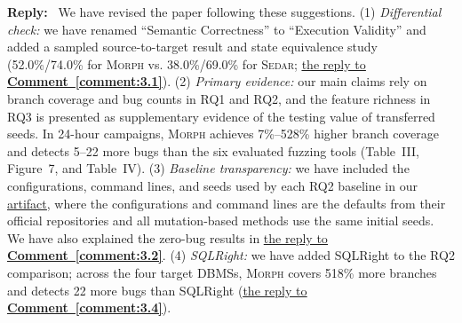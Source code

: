 \documentclass[12pt,letterpaper]{article}
\let\oldhref\href
\renewcommand{\href}[2]{\oldhref{#1}{\uline{#2}}}
\newcommand{\morph}{\textsc{Morph}}
\newcommand{\sedar}{\textsc{Sedar}}
\newcommand{\tool}{\morph}
\newcommand{\commentref}[1]{\hyperref[comment:#1]{\uline{the reply to \textbf{Comment~\ref*{comment:#1}}}}}
\newcommand{\reply}{\par\nobreak\noindent\textbf{Reply:}\ }
\begin{document}
\reply
We have revised the paper following these suggestions. (1) \textit{Differential check:} we have renamed ``Semantic Correctness'' to ``Execution Validity'' and added a sampled source-to-target result and state equivalence study (52.0\%/74.0\% for \tool{} vs. 38.0\%/69.0\% for \sedar{}; \commentref{3.1}). (2) \textit{Primary evidence:} our main claims rely on branch coverage and bug counts in RQ1 and RQ2, and the feature richness in RQ3 is presented as supplementary evidence of the testing value of transferred seeds. In 24-hour campaigns, \tool{} achieves 7\%--528\% higher branch coverage and detects 5--22 more bugs than the six evaluated fuzzing tools (Table~III, Figure~7, and Table~IV). (3) \textit{Baseline transparency:} we have included the configurations, command lines, and seeds used by each RQ2 baseline in our \href{https://anonymous.4open.science/r/MorphArtifact-8E44/}{artifact}, where the configurations and command lines are the defaults from their official repositories and all mutation-based methods use the same initial seeds. We have also explained the zero-bug results in \commentref{3.2}. (4) \textit{SQLRight:} we have added SQLRight to the RQ2 comparison; across the four target DBMSs, \tool{} covers 518\% more branches and detects 22 more bugs than SQLRight (\commentref{3.4}).
\end{document}
